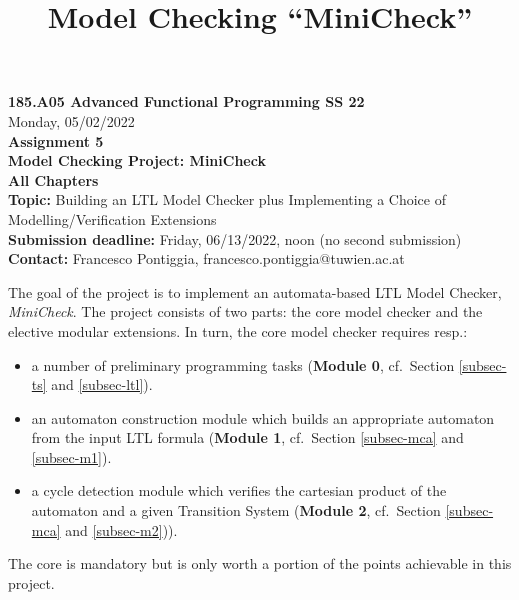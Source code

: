 \documentclass{article}
\title{Model Checking ``MiniCheck''}
\begin{document}
\large
\thispagestyle{empty}
\begin{center}
  {\Large \textbf{185.A05 Advanced Functional Programming SS 22}}  \\ [1ex] 
            Monday, 05/02/2022 \\
               {\Large \textbf{Assignment 5}} \\[.5ex]
              {\Large \textbf{Model Checking Project: MiniCheck}} \\[.5ex]
                 \textbf{All Chapters}  \\ [.75ex]
           \textbf{Topic:} Building an LTL Model Checker plus Implementing a Choice of Modelling/Verification Extensions  \\[1ex]
          \textbf{Submission deadline:} Friday, 06/13/2022, noon (no second submission)  \\ [0.5ex]
          \textbf{Contact:} Francesco Pontiggia, francesco.pontiggia@tuwien.ac.at 
\end{center}

\vspace{1ex}
\noindent
\noindent





\newcommand{\code}[1]{\texttt{#1}}

\noindent
The goal of the project is to implement an automata-based LTL Model Checker, \textit{MiniCheck}. 
The project consists of two parts: the core model checker and the elective modular extensions. 
In turn, the core model checker requires resp.: 
\begin{itemize}
    \item a number of preliminary programming tasks (\textbf{Module 0}, cf.~Section \ref{subsec-ts} and \ref{subsec-ltl}).
    \item an automaton construction module which builds an appropriate automaton from the input LTL formula (\textbf{Module 1}, cf.~Section \ref{subsec-mca} and \ref{subsec-m1}).
    \item a cycle detection module which verifies the cartesian product of the automaton and a given Transition System
          (\textbf{Module 2}, cf.~Section \ref{subsec-mca} and \ref{subsec-m2})).
\end{itemize}  
The core is mandatory but is only worth a portion of the points achievable in this project.
\end{document}
